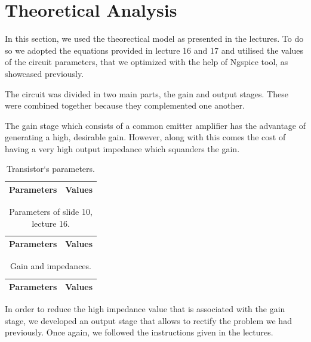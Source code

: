 \section{Theoretical Analysis}
\label{sec:analysis}

\par In this section, we used the theorectical model as presented in the lectures. To do so we adopted the equations provided in lecture 16 and 17 and utilised the values of the circuit parameters, that we optimized with the help of Ngspice tool, as showcased previously.

\par The circuit was divided in two main parts, the gain and output stages. These were combined together because they complemented one another.

\par The gain stage which consists of a common emitter amplifier has the advantage of generating a high, desirable gain. However, along with this comes the cost of having a very high output impedance which squanders the gain.

\begin{table}[h]
  \centering
  \begin{tabular}{|l|r|}
    \hline    
    {\bf Parameters} & {\bf Values} \\ \hline
    
  \end{tabular}
  \caption{Transistor`s parameters.}
  \label{tab:1}
\end{table}

\begin{table}[h]
  \centering
  \begin{tabular}{|l|r|}
    \hline    
    {\bf Parameters} & {\bf Values} \\ \hline
    
  \end{tabular}
  \caption{Parameters of slide 10, lecture 16.}
  \label{tab:2}
\end{table}

\begin{table}[h]
  \centering
  \begin{tabular}{|l|r|}
    \hline    
    {\bf Parameters} & {\bf Values} \\ \hline
    
  \end{tabular}
  \caption{Gain and impedances.}
  \label{tab:3}
\end{table}


\par In order to reduce the high impedance value that is associated with the gain stage, we developed an output stage that allows to rectify the problem we had previously. Once again, we followed the instructions given in the lectures.

